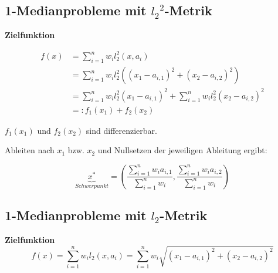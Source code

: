 
    \subsection{1-Medianprobleme mit ${l_2}^{2}$-Metrik} %
    \label{sub:1_medianprobleme_mit_l2^2_Metrik}

    \par \textbf{Zielfunktion}

    \begin{equation}
      \begin{aligned}
        f(x) &= \sum_{i=1}^{n}w_{i}l_{2}^{2}(x, a_i) \\
             &= \sum_{i=1}^{n}w_{i}l_{2}^{2}((x_1 - a_{i, 1})^2 + (x_2 - a_{i,2})^2) \\
             &= \sum_{i=1}^{n}w_{i}l_{2}^{2}(x_1 - a_{i, 1})^2 + \sum_{i=1}^{n}w_{i}l_{2}^{2}(x_2 - a_{i, 2})^2 \\
             &=: f_1(x_1) + f_2(x_2)
      \end{aligned}
    \end{equation}

    \par $f_1(x_1)$ und $f_2(x_2)$ sind differenzierbar.

    \par Ableiten nach $x_1$ bzw. $x_2$ und Nullsetzen der jeweiligen Ableitung ergibt:

    \begin{equation*}
      \underbrace{x^*}_{Schwerpunkt} = \left(\frac{\sum_{i=1}^{n}w_ia_{i,1}}{\sum_{i=1}^{n}w_i}, \frac{\sum_{i=1}^{n}w_ia_{i,2}}{\sum_{i=1}^{n}w_i} \right)
    \end{equation*}
    

    \subsection{1-Medianprobleme mit $l_2$-Metrik} %
    \label{sub:1_medianprobleme_mit_l2_Metrik}

      {\color{blue}{Aufgabe 8}}

      \par \textbf{Zielfunktion}
      \begin{equation}
        f(x) = \sum_{i=1}^{n}w_il_2(x, a_i) = \sum_{i=1}^{n}w_i\sqrt{(x_1 - a_{i,1})^2 + (x_2 - a_{i,2})^2}
      \end{equation}

